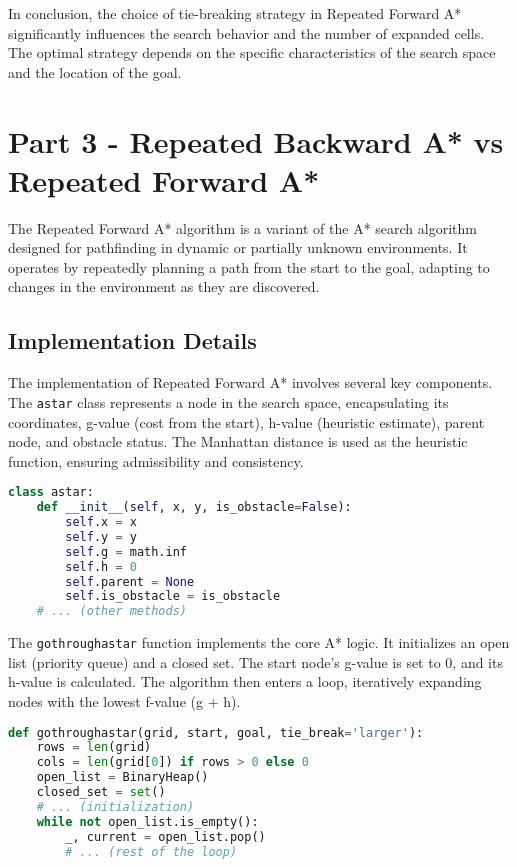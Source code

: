 \documentclass[12pt]{article}
\begin{document}
In conclusion, 
the choice of tie-breaking strategy in Repeated Forward A* significantly influences the search behavior and the number of expanded cells. 
The optimal strategy depends on the specific characteristics of the search space and the location of the goal.

\section{Part 3 - Repeated Backward A* vs Repeated Forward A*}

The Repeated Forward A* algorithm is a variant of the A* search algorithm designed for pathfinding in dynamic or partially unknown environments. 
It operates by repeatedly planning a path from the start to the goal, 
adapting to changes in the environment as they are discovered.

\subsection{Implementation Details}

The implementation of Repeated Forward A* involves several key components. 
The \texttt{astar} class represents a node in the search space, 
encapsulating its coordinates, 
g-value (cost from the start), 
h-value (heuristic estimate), 
parent node, 
and obstacle status. 
The Manhattan distance is used as the heuristic function, 
ensuring admissibility and consistency.

\begin{lstlisting}[language=Python, basicstyle=\ttfamily]
class astar:
    def __init__(self, x, y, is_obstacle=False):
        self.x = x
        self.y = y
        self.g = math.inf
        self.h = 0
        self.parent = None
        self.is_obstacle = is_obstacle
    # ... (other methods)
\end{lstlisting}

The \texttt{gothroughastar} function implements the core A* logic. 
It initializes an open list 
(priority queue) 
and a closed set. The start node's g-value is set to 0, 
and its h-value is calculated. 
The algorithm then enters a loop, 
iteratively expanding nodes with the lowest f-value (g + h).

\begin{lstlisting}[language=Python, basicstyle=\ttfamily]
def gothroughastar(grid, start, goal, tie_break='larger'):
    rows = len(grid)
    cols = len(grid[0]) if rows > 0 else 0
    open_list = BinaryHeap()
    closed_set = set()
    # ... (initialization)
    while not open_list.is_empty():
        _, current = open_list.pop()
        # ... (rest of the loop)
\end{lstlisting}
\end{document}
